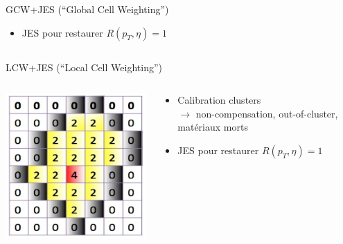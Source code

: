 \begin{frame}
\begin{columns}
\begin{column}{0.55\textwidth}
{\begin{block}{GCW+JES {\small (``Global Cell Weighting'')}}
\begin{itemize}
\begin{scriptsize}
\[\chi^2=\sum\limits_\text{jets}\left(E^{GCW}/E^{truth}-1\right)^2\]
\end{scriptsize}
\\
avec \\
\begin{scriptsize}
\[E^{GCW}=\sum\limits_{i: \text{cellules}} w_i\left(E_i/V_i\right)E_i\]
\end{scriptsize}
\item JES pour restaurer $R(p_T,\eta)=1$
\end{itemize}
\end{block}
}
\end{column}
\end{columns}
\pause
\begin{columns}
\begin{column}{0.65\textwidth}
{
\begin{block}{LCW+JES {\small (``Local Cell Weighting'')}}
\begin{columns}
\begin{column}{0.4\textwidth}
\vspace*{-0.5cm}
\begin{center}
\includegraphics[scale=0.2]{Figures/JES/topoclusterillustration.png}
\end{center}
\end{column}
\hspace{-1cm}
\begin{column}{0.75\textwidth}
\begin{itemize}
\item Calibration clusters\\
$\rightarrow$ non-compensation, out-of-cluster, mat\'eriaux morts
\item JES pour restaurer $R(p_T,\eta)=1$\\

\end{itemize}
\end{column}
\end{columns}
\end{block}}
\end{column}
\end{columns}
\end{frame}
